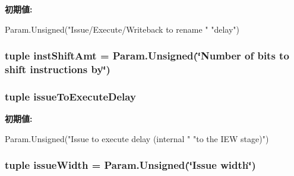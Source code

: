 \label{classOzoneCPU_1_1DerivOzoneCPU_a54dd22869ae708c0b6bffab65d4d03c5}
{\bfseries 初期値:}
\begin{DoxyCode}
Param.Unsigned("Issue/Execute/Writeback to rename "
               "delay")
\end{DoxyCode}
\hypertarget{classOzoneCPU_1_1DerivOzoneCPU_a04bfc27685a42245093252b2fab219a5}{
\subsubsection[{instShiftAmt}]{\setlength{\rightskip}{0pt plus 5cm}tuple {\bf instShiftAmt} = Param.Unsigned(\char`\"{}Number of bits to shift instructions by\char`\"{})}}
\label{classOzoneCPU_1_1DerivOzoneCPU_a04bfc27685a42245093252b2fab219a5}
\hypertarget{classOzoneCPU_1_1DerivOzoneCPU_ab445ea6366a58d7753b058bd794548a8}{
\subsubsection[{issueToExecuteDelay}]{\setlength{\rightskip}{0pt plus 5cm}tuple {\bf issueToExecuteDelay}}}
\label{classOzoneCPU_1_1DerivOzoneCPU_ab445ea6366a58d7753b058bd794548a8}
{\bfseries 初期値:}
\begin{DoxyCode}
Param.Unsigned("Issue to execute delay (internal "
              "to the IEW stage)")
\end{DoxyCode}
\hypertarget{classOzoneCPU_1_1DerivOzoneCPU_a1e02adcb8a1e64fc82f4b389844d2f68}{
\subsubsection[{issueWidth}]{\setlength{\rightskip}{0pt plus 5cm}tuple {\bf issueWidth} = Param.Unsigned(\char`\"{}Issue {\bf width}\char`\"{})}}
\label{classOzoneCPU_1_1DerivOzoneCPU_a1e02adcb8a1e64fc82f4b389844d2f68}
